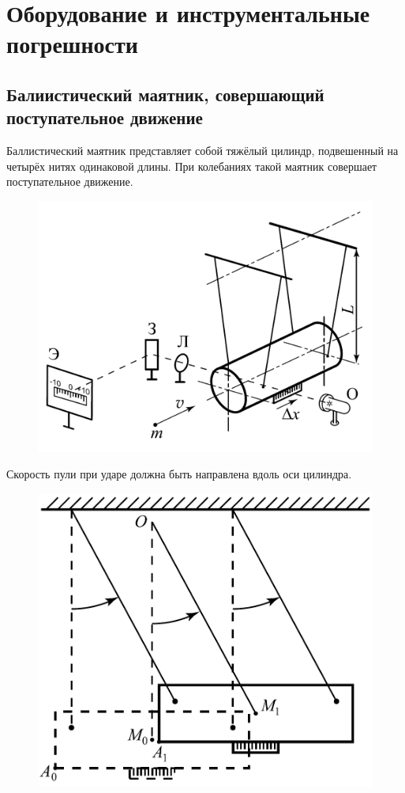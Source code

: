 \section{Оборудование и инструментальные погрешности}

\subsection{Балиистический маятник, совершающий поступательное движение}

Баллистический маятник представляет собой тяжёлый цилиндр, подвешенный на четырёх
нитях одинаковой длины. При колебаниях такой маятник совершает поступательное
движение.

\begin{figure}[ht!]
    \centering\includegraphics[width=0.8\linewidth]{img/scheme1.png}
\end{figure}

Скорость пули при ударе должна быть направлена вдоль оси цилиндра.

\begin{figure}[ht!]
    \centering\includegraphics[width=0.8\linewidth]{img/scheme2.png}
\end{figure}

